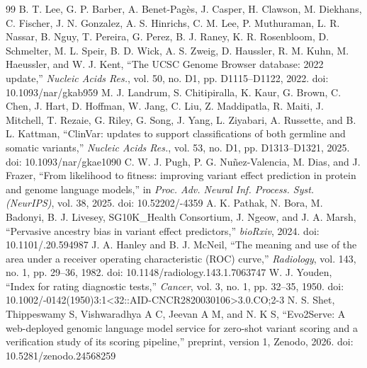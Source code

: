 \begin{thebibliography}{99}
 B. T. Lee, G. P. Barber, A. Benet-Pagès, J. Casper, H. Clawson, M. Diekhans, C. Fischer, J. N. Gonzalez, A. S. Hinrichs, C. M. Lee, P. Muthuraman, L. R. Nassar, B. Nguy, T. Pereira, G. Perez, B. J. Raney, K. R. Rosenbloom, D. Schmelter, M. L. Speir, B. D. Wick, A. S. Zweig, D. Haussler, R. M. Kuhn, M. Haeussler, and W. J. Kent, ``The UCSC Genome Browser database: 2022 update,'' \emph{Nucleic Acids Res.}, vol. 50, no. D1, pp. D1115--D1122, 2022. doi: 10.1093/\allowbreak nar/\allowbreak gkab959
 M. J. Landrum, S. Chitipiralla, K. Kaur, G. Brown, C. Chen, J. Hart, D. Hoffman, W. Jang, C. Liu, Z. Maddipatla, R. Maiti, J. Mitchell, T. Rezaie, G. Riley, G. Song, J. Yang, L. Ziyabari, A. Russette, and B. L. Kattman, ``ClinVar: updates to support classifications of both germline and somatic variants,'' \emph{Nucleic Acids Res.}, vol. 53, no. D1, pp. D1313--D1321, 2025. doi: 10.1093/\allowbreak nar/\allowbreak gkae1090
 C. W. J. Pugh, P. G. Nuñez-Valencia, M. Dias, and J. Frazer, ``From likelihood to fitness: improving variant effect prediction in protein and genome language models,'' in \emph{Proc. Adv. Neural Inf. Process. Syst. (NeurIPS)}, vol. 38, 2025. doi: 10.52202/-4359
 A. K. Pathak, N. Bora, M. Badonyi, B. J. Livesey, SG10K\_Health Consortium, J. Ngeow, and J. A. Marsh, ``Pervasive ancestry bias in variant effect predictors,'' \emph{bioRxiv}, 2024. doi: 10.1101/.20.594987
 J. A. Hanley and B. J. McNeil, ``The meaning and use of the area under a receiver operating characteristic (ROC) curve,'' \emph{Radiology}, vol. 143, no. 1, pp. 29--36, 1982. doi: 10.1148/\allowbreak radiology.143.1.7063747
 W. J. Youden, ``Index for rating diagnostic tests,'' \emph{Cancer}, vol. 3, no. 1, pp. 32--35, 1950. doi: 10.1002/-0142(1950)3:1\textless{}32::AID-CNCR2820030106\textgreater{}3.0.CO;2-3
 N. S. Shet, Thippeswamy S, Vishwaradhya A C, Jeevan A M, and N. K S, ``Evo2Serve: A web-deployed genomic language model service for zero-shot variant scoring and a verification study of its scoring pipeline,'' preprint, version 1, Zenodo, 2026. doi: 10.5281/\allowbreak zenodo.24568259
\end{thebibliography}
\label{s:ref:end}

